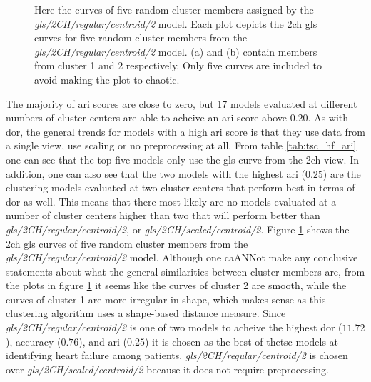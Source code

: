 \begin{figure}[htb]
    \centering
    
    \caption{Here the curves of five random cluster members assigned by the \textit{gls/2CH/regular/centroid/2} model.
             Each plot depicts the \acrshort{2ch} \acrshort{gls} curves for five random cluster members from the \textit{gls/2CH/regular/centroid/2} model. 
             (a) and (b) contain members from cluster 1 and 2 respectively. Only five curves are included to avoid making the plot to chaotic.}
    \label{fig:tsc_hf_best_meth_5_samples}
\end{figure}

\newpage

The majority of \acrshort{ari} scores are close to zero, but 17 models evaluated at different numbers of cluster centers are able to acheive an \acrshort{ari} score above $0.20$.
As with \acrshort{dor}, the general trends for models with a high \acrshort{ari} score is that they use data from a single view, use scaling or no preprocessing at all.
From table \ref{tab:tsc_hf_ari} one can see that the top five models only use the \acrshort{gls} curve from the \acrshort{2ch} view. 
In addition, one can also see that the two models with the highest \acrshort{ari} ($0.25$) are the clustering models evaluated at two cluster centers that perform best in terms of \acrshort{dor} as well. 
This means that there most likely are no models evaluated at a number of cluster centers higher than two 
that will perform better than \textit{gls/2CH/regular/centroid/2}, or \textit{gls/2CH/scaled/centroid/2}.
Figure \ref{fig:tsc_hf_best_meth_5_samples} shows the \acrshort{2ch} \acrshort{gls} curves of five random cluster members from the \textit{gls/2CH/regular/centroid/2} model.
Although one caANNot make any conclusive statements about what the general similarities between cluster members are, from the plots in figure \ref{fig:tsc_hf_best_meth_5_samples}
it seems like the curves of cluster 2 are smooth, while the curves of cluster 1 are more irregular in shape, which makes sense as this clustering algorithm uses a shape-based distance measure.
Since \textit{gls/2CH/regular/centroid/2} is one of two models to acheive the highest \acrshort{dor} ($11.72$), accuracy ($0.76$), and \acrshort{ari} ($0.25$) it is chosen as the best of the\acrshort{tsc} models
at identifying heart failure among patients. \textit{gls/2CH/regular/centroid/2} is chosen over \textit{gls/2CH/scaled/centroid/2} because it does not require preprocessing.
\bigskip

